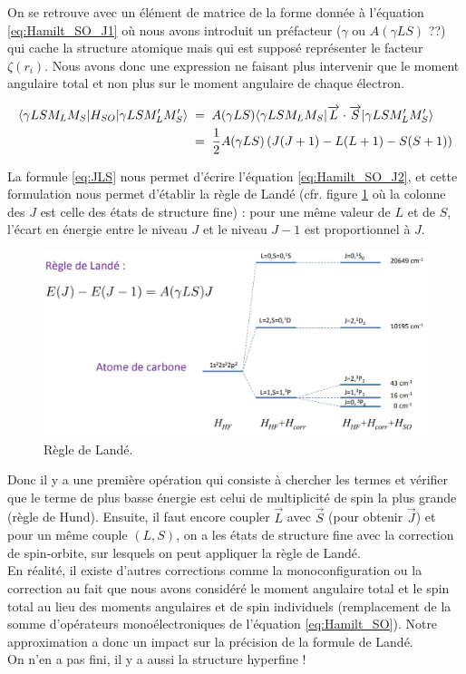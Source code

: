 On se retrouve avec un élément de matrice de la forme donnée à l'équation \eqref{eq:Hamilt_SO_J1} où nous avons introduit un préfacteur ($\gamma$ ou $A(\gamma L S)$ ??) qui cache la structure atomique mais qui est supposé représenter le facteur $\zeta(r_i)$. Nous avons donc une expression ne faisant plus intervenir que le moment angulaire total et non plus sur le moment angulaire de chaque électron.

\begin{align}
    \langle \gamma LSM_LM_S|H_{SO}|\gamma LSM_L'M_S' \rangle &\; = \;  A(\gamma LS)\langle \gamma LSM_LM_S|\overrightarrow{L}\cdot\overrightarrow{S}|\gamma LSM_L'M_S' \rangle
    \label{eq:Hamilt_SO_J1}    \\
    &\; = \;  
    \dfrac{1}{2}A(\gamma LS)\left( J(J+1)-L(L+1)-S(S+1)\right)
    \label{eq:Hamilt_SO_J2}
\end{align}

La formule \eqref{eq:JLS} nous permet d’écrire l'équation \eqref{eq:Hamilt_SO_J2}, et cette formulation nous permet d'établir la règle de Landé (cfr. figure \ref{fig:RegleLandé} où la colonne des $J$ est celle des états de structure fine) : pour une même valeur de $L$ et de $S$, l’écart en énergie entre le niveau $J$ et le niveau $J-1$ est proportionnel à $J$.

\begin{figure}[tph]
    \centering
    \includegraphics[scale=0.50]{Images2/regleLande.jpg}
    \caption{Règle de Landé.}
    \label{fig:RegleLandé}
\end{figure}

Donc il y a une première opération qui consiste à chercher les termes et vérifier que le terme de plus basse énergie est celui de multiplicité de spin la plus grande (règle de Hund). Ensuite, il faut encore coupler $\overrightarrow{L}$ avec $\overrightarrow{S}$ (pour obtenir $\overrightarrow{J}$) et pour un même couple $(L,S)$, on a les états de structure fine avec la correction de spin-orbite, sur lesquels on peut appliquer la règle de Landé.\\
En réalité, il existe d'autres corrections comme la monoconfiguration ou la correction au fait que nous avons considéré le moment angulaire total et le spin total au lieu des moments angulaires et de spin individuels (remplacement de la somme d'opérateurs monoélectroniques de l'équation \eqref{eq:Hamilt_SO}). Notre approximation a donc un impact sur la précision de la formule de Landé.\\
On n’en a pas fini, il y a aussi la structure hyperfine !

